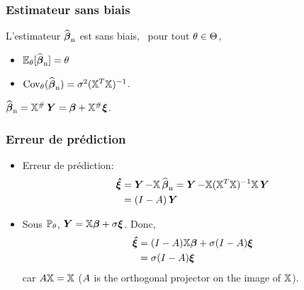 \begin{frame}
\frametitle{Estimateur sans biais}
\begin{theo}
L'estimateur $\operatorname{\widehat{\boldsymbol{\beta}}_n}$ est sans biais, \ie\ pour tout $\theta \in \Theta$,
\begin{itemize}
\item $\operatorname{{\mathbb E}}_{\theta}[\operatorname{\widehat{\boldsymbol{\beta}}_n}]= \theta$
\item $\mathrm{Cov}_{\theta}(\operatorname{\widehat{\boldsymbol{\beta}}_n})= \sigma^2 (\mathbb{X}^T \mathbb{X})^{-1}$.
\end{itemize}
\end{theo}
\alert{$\operatorname{\widehat{\boldsymbol{\beta}}_n} = \mathbb{X}^{\#} \operatorname{\boldsymbol{Y}}= \boldsymbol{\beta} + \mathbb{X}^{\#} \boldsymbol{\xi}$.}
\end{frame}

\begin{frame}
\frametitle{Erreur de prédiction}
\begin{itemize}
\item \alert{Erreur de prédiction}:
\begin{align*}
\boldsymbol{\hat{\xi}}
&= \operatorname{\boldsymbol{Y}} - \mathbb{X} \operatorname{\widehat{\boldsymbol{\beta}}_n}= \operatorname{\boldsymbol{Y}} - \mathbb{X} (\mathbb{X}^T \mathbb{X})^{-1} \mathbb{X} \operatorname{\boldsymbol{Y}} \\
&= (I - A) \operatorname{\boldsymbol{Y}}
\end{align*}
\item Sous $\operatorname{{\mathbb P}}_\theta$, $\operatorname{\boldsymbol{Y}}= \mathbb{X} \boldsymbol{\beta} +  \sigma \boldsymbol{\xi}$. Donc,
\begin{align*}
\boldsymbol{\hat{\xi}} &= (I-A) \mathbb{X} \boldsymbol{\beta} + \sigma (I-A)  \boldsymbol{\xi} \\
         &= \sigma (I-A) \boldsymbol{\xi}
\end{align*}
car $A \mathbb{X}= \mathbb{X}$ ($A$ is the orthogonal projector on the image of $\mathbb{X}$).
\end{itemize}
\end{frame}

